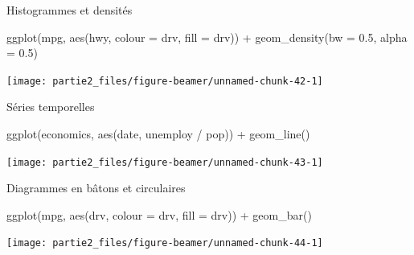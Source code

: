 \documentclass[12pt,ignorenonframetext,]{beamer}
\newenvironment{Shaded}{}{}
\newcommand{\KeywordTok}[1]{\textcolor[rgb]{0.00,0.00,1.00}{#1}}
\newcommand{\DataTypeTok}[1]{#1}
\newcommand{\FloatTok}[1]{#1}
\newcommand{\StringTok}[1]{\textcolor[rgb]{0.00,0.50,0.50}{#1}}
\newcommand{\OperatorTok}[1]{#1}
\newcommand{\NormalTok}[1]{#1}
\renewenvironment{Shaded}{\begin{snugshade}}{\end{snugshade}}
\begin{document}
\begin{frame}[fragile]{Histogrammes et densités}

\footnotesize \center

\begin{Shaded}
\begin{Highlighting}[]
\KeywordTok{ggplot}\NormalTok{(mpg, }\KeywordTok{aes}\NormalTok{(hwy, }\DataTypeTok{colour =}\NormalTok{ drv, }\DataTypeTok{fill =}\NormalTok{ drv)) }\OperatorTok{+}\StringTok{ }
\StringTok{  }\KeywordTok{geom_density}\NormalTok{(}\DataTypeTok{bw =} \FloatTok{0.5}\NormalTok{, }\DataTypeTok{alpha =} \FloatTok{0.5}\NormalTok{)}
\end{Highlighting}
\end{Shaded}

\texttt{[image: partie2\_files/figure-beamer/unnamed-chunk-42-1]}

\end{frame}

\begin{frame}[fragile]{Séries temporelles}

\footnotesize \center

\begin{Shaded}
\begin{Highlighting}[]
\KeywordTok{ggplot}\NormalTok{(economics, }\KeywordTok{aes}\NormalTok{(date, unemploy }\OperatorTok{/}\StringTok{ }\NormalTok{pop)) }\OperatorTok{+}
\StringTok{  }\KeywordTok{geom_line}\NormalTok{()}
\end{Highlighting}
\end{Shaded}

\texttt{[image: partie2\_files/figure-beamer/unnamed-chunk-43-1]}

\end{frame}

\begin{frame}[fragile]{Diagrammes en bâtons et circulaires}

\footnotesize \center

\begin{Shaded}
\begin{Highlighting}[]
\KeywordTok{ggplot}\NormalTok{(mpg, }\KeywordTok{aes}\NormalTok{(drv, }\DataTypeTok{colour =}\NormalTok{ drv, }\DataTypeTok{fill =}\NormalTok{ drv)) }\OperatorTok{+}\StringTok{ }
\StringTok{  }\KeywordTok{geom_bar}\NormalTok{()}
\end{Highlighting}
\end{Shaded}

\texttt{[image: partie2\_files/figure-beamer/unnamed-chunk-44-1]}

\end{frame}
\end{document}

